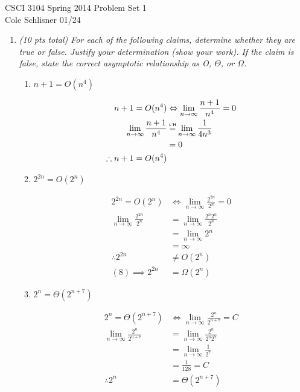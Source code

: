 \documentclass[12pt]{article}
\newcommand\lhop{\mathrel{\overset{\makebox[0pt]{\mbox{\normalfont\tiny\sffamily L'H}}}{=}}}
\newcommand\lmni{\lim_{n\to\infty}}
\begin{document}
CSCI 3104 Spring 2014 \hfill Problem Set 1\\
Cole Schlisner 01/24 

\hrulefill

\begin{enumerate}

	\item	\textit{(10 pts total) For each of the following claims, determine whether they are true or false. Justify your determination (show your work). If the claim is false, state the correct asymptotic relationship as O, $\Theta$, or $\Omega$.}

	\begin{enumerate}

		\item \textit{$n + 1 = O(n^4)$}
		
		\begin{align}
		 n + 1 = O(n^4) & \Leftrightarrow \lmni \frac{n + 1}{n^4} = 0 \\
		 \lmni \frac{n + 1}{n^4} & \lhop \lmni \frac{1}{4n^3} \\
		 & = 0 \\
		 \therefore n + 1 = O(n^4)
		\end{align}
		
		\item \textit{$2^{2n} = O(2^n)$}
		
		\begin{align}
		 2^{2n} = O(2^n) & \Leftrightarrow \lmni \frac{2^{2n}}{2^n} = 0 \\
		 \lmni \frac{2^{2n}}{2^n} & = \lmni \frac{2^n2^n}{2^n} \\
		 & = \lmni 2^n \\
		 & = \infty \\
		 \therefore 2^{2n} & \neq O(2^n) \\
		 (8) \implies 2^{2n} & = \Omega(2^n)
		\end{align}
		\pagebreak

		\item \textit{$2^n = \Theta(2^{n+7})$}
		
		\begin{align}
		 2^n = \Theta(2^{n+7}) & \Leftrightarrow \lmni \frac{2^n}{2^{n+7}} = C \\
		 \lmni \frac{2^n}{2^{n+7}} & = \lmni \frac{2^n}{2^n2^7} \\
		 & = \lmni \frac{1}{2^7} \\
		 & = \frac{1}{128} = C\\
		 \therefore 2^n & = \Theta(2^{n+7}) 
		\end{align}
		

\end{enumerate}
\end{enumerate}
\end{document}
